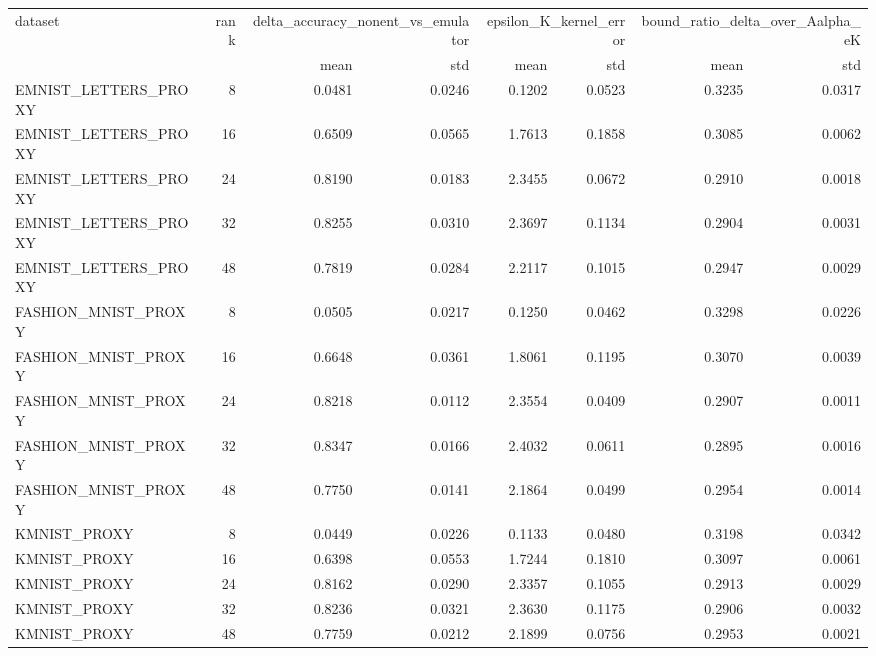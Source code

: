 \begin{tabular}{lrrrrrrr}
\toprule
dataset & rank & \multicolumn{2}{r}{delta\_accuracy\_nonent\_vs\_emulator} & \multicolumn{2}{r}{epsilon\_K\_kernel\_error} & \multicolumn{2}{r}{bound\_ratio\_delta\_over\_Aalpha\_eK} \\
 &  & mean & std & mean & std & mean & std \\
\midrule
EMNIST\_LETTERS\_PROXY & 8 & 0.0481 & 0.0246 & 0.1202 & 0.0523 & 0.3235 & 0.0317 \\
EMNIST\_LETTERS\_PROXY & 16 & 0.6509 & 0.0565 & 1.7613 & 0.1858 & 0.3085 & 0.0062 \\
EMNIST\_LETTERS\_PROXY & 24 & 0.8190 & 0.0183 & 2.3455 & 0.0672 & 0.2910 & 0.0018 \\
EMNIST\_LETTERS\_PROXY & 32 & 0.8255 & 0.0310 & 2.3697 & 0.1134 & 0.2904 & 0.0031 \\
EMNIST\_LETTERS\_PROXY & 48 & 0.7819 & 0.0284 & 2.2117 & 0.1015 & 0.2947 & 0.0029 \\
FASHION\_MNIST\_PROXY & 8 & 0.0505 & 0.0217 & 0.1250 & 0.0462 & 0.3298 & 0.0226 \\
FASHION\_MNIST\_PROXY & 16 & 0.6648 & 0.0361 & 1.8061 & 0.1195 & 0.3070 & 0.0039 \\
FASHION\_MNIST\_PROXY & 24 & 0.8218 & 0.0112 & 2.3554 & 0.0409 & 0.2907 & 0.0011 \\
FASHION\_MNIST\_PROXY & 32 & 0.8347 & 0.0166 & 2.4032 & 0.0611 & 0.2895 & 0.0016 \\
FASHION\_MNIST\_PROXY & 48 & 0.7750 & 0.0141 & 2.1864 & 0.0499 & 0.2954 & 0.0014 \\
KMNIST\_PROXY & 8 & 0.0449 & 0.0226 & 0.1133 & 0.0480 & 0.3198 & 0.0342 \\
KMNIST\_PROXY & 16 & 0.6398 & 0.0553 & 1.7244 & 0.1810 & 0.3097 & 0.0061 \\
KMNIST\_PROXY & 24 & 0.8162 & 0.0290 & 2.3357 & 0.1055 & 0.2913 & 0.0029 \\
KMNIST\_PROXY & 32 & 0.8236 & 0.0321 & 2.3630 & 0.1175 & 0.2906 & 0.0032 \\
KMNIST\_PROXY & 48 & 0.7759 & 0.0212 & 2.1899 & 0.0756 & 0.2953 & 0.0021 \\
\bottomrule
\end{tabular}

